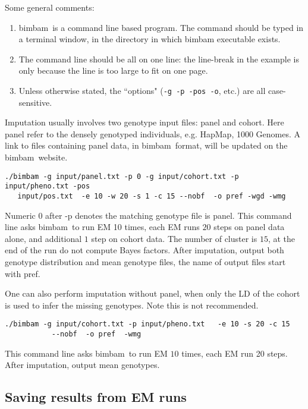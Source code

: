 \documentclass[11pt,Palatino]{article}
\def\bimbam{{\sc bimbam}~}
\begin{document}
Some general comments: 
\begin{enumerate}
\item \bimbam is a command line based program. The command should be typed in a terminal window, in the directory in which bimbam executable exists.
\item The command line should be all on one line: the line-break in the example is only because the line is too large to fit on one page.
\item Unless otherwise stated, the ``options" ({\tt -g -p -pos -o}, etc.) are all case-sensitive.
\end{enumerate}

Imputation usually involves two genotype input files: panel and cohort. Here panel refer to the densely genotyped individuals, e.g. HapMap, 1000 Genomes.  A link to files containing panel data, in \bimbam format, will be updated on the \bimbam website.

\begin{verbatim}
./bimbam -g input/panel.txt -p 0 -g input/cohort.txt -p input/pheno.txt -pos 
   input/pos.txt  -e 10 -w 20 -s 1 -c 15 --nobf  -o pref -wgd -wmg
\end{verbatim}
Numeric $0$ after -p denotes the matching genotype file is panel. This command  line asks \bimbam to run EM 10 times, each EM runs $20$ steps on panel data alone, and additional $1$ step on cohort data. The number of cluster is $15$, at the end of the run do not compute Bayes factors. After imputation, output both genotype distribution and mean genotype files, the name of output files start with pref.   

One can also perform imputation without panel, when only the LD of the cohort is used to infer the missing genotypes. Note this is not recommended.   
\begin{verbatim}
./bimbam -g input/cohort.txt -p input/pheno.txt   -e 10 -s 20 -c 15 
           --nobf  -o pref  -wmg
\end{verbatim}
This command line asks \bimbam to run EM $10$ times, each EM run 20 steps. After imputation, output mean genotypes.

\subsection{Saving results from EM runs}
\end{document}
